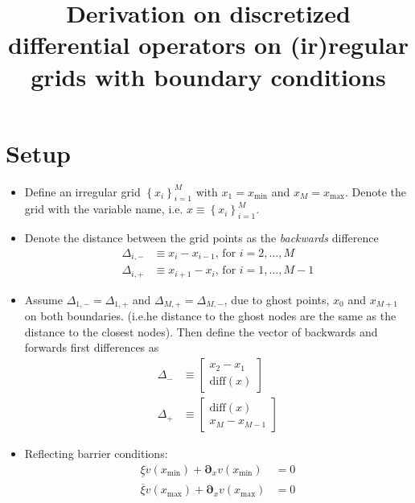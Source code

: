 \documentclass[11pt]{article}
\newcommand{\D}[1][]{\ensuremath{\boldsymbol{\partial}_{#1}}}
\newcommand{\set}[1]{\ensuremath{\left\{{#1}\right\}}}
\begin{document}
\title{Derivation on discretized differential operators on (ir)regular grids with boundary conditions}
\maketitle

\section{Setup}

\begin{itemize}
	\item Define an irregular grid $\set{x_i}_{i=1}^M$ with $x_1 = {x_{\min}}$ and $x_{M} = {x_{\max}}$. Denote the grid with the variable name, i.e. $x \equiv \set{x_i}_{i=1}^M$.
	\item Denote the distance between the grid points as the \textit{backwards} difference
	\begin{align}
	\Delta_{i,-} &\equiv x_i - x_{i-1},\, \text{for } i = 2,\ldots, M\\
	\Delta_{i,+} &\equiv x_{i+1} - x_i,\, \text{for } i = 1,\ldots, M-1
	\end{align}
	
	\item Assume $\Delta_{1, -} = \Delta_{1, +}$ and $\Delta_{M, +} = \Delta_{M, -}$, due to ghost points, $x_0$ and $x_{M+1}$ on both boundaries. (i.e.he distance to the ghost nodes are the same as the distance to the closest nodes).  Then define the vector of backwards and forwards first differences as
	\begin{align}
	\Delta_{-} &\equiv \begin{bmatrix} x_2 - x_1 \\
	\text{diff}(x)
	\end{bmatrix}\\
	\Delta_{+} &\equiv \begin{bmatrix} \text{diff}(x)\\
	x_{M} - x_{M-1}
	\end{bmatrix}
	\end{align}
	\item Reflecting barrier conditions:
	\begin{align}
	\underline{\xi} v({x_{\min}}) + \D[x]v({x_{\min}} ) &= 0\label{eq:new-BC1}\\
	\overline{\xi} v({x_{\max}}) + \D[x]v({x_{\max}}) &= 0\label{eq:new-BC2}
	\end{align}
\end{itemize}
\end{document}
